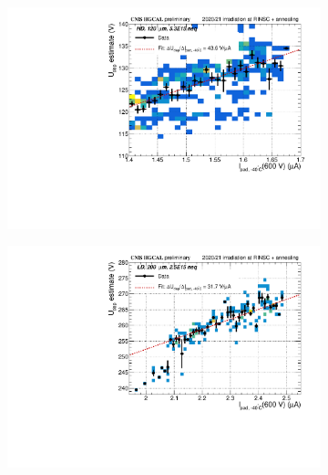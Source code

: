 \begin{figure}
	\captionsetup[subfigure]{aboveskip=-1pt,belowskip=-1pt}
	\centering
	\begin{subfigure}[b]{0.32\textwidth}
		\centering
		\includegraphics[width=0.999\textwidth]{plots/Vdep_vs_fluence/Vdep_vs_current_3009.pdf}
		\subcaption{
			}
			\label{plot:Vdep_vs_current_3009}
	\end{subfigure}
	\hfill	
	\begin{subfigure}[b]{0.32\textwidth}
		\centering
		\includegraphics[width=0.999\textwidth]{plots/Vdep_vs_fluence/Vdep_vs_current_5414.pdf}
		\subcaption{
			}
			\label{plot:Vdep_vs_current_5414}
	\end{subfigure}
	\hfill
	\begin{subfigure}[b]{0.32\textwidth}
		\centering

\end{subfigure}
\end{figure}

